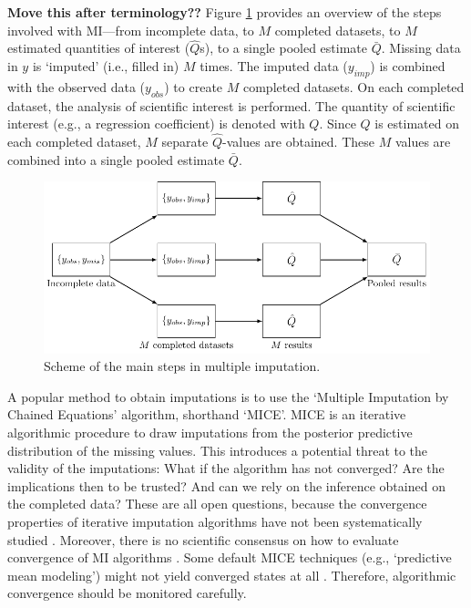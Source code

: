 \documentclass[Royal,times,sageh]{sagej}
\begin{document}
\textbf{Move this after terminology??} Figure \ref{fig:diagram} provides
an overview of the steps involved with MI---from incomplete data, to
\(M\) completed datasets, to \(M\) estimated quantities of interest
(\(\hat{Q}\)s), to a single pooled estimate \(\bar{Q}\). Missing data in
\(y\) is `imputed' (i.e., filled in) \(M\) times. The imputed data
(\(y_{imp}\)) is combined with the observed data (\(y_{obs}\)) to create
\(M\) completed datasets. On each completed dataset, the analysis of
scientific interest is performed. The quantity of scientific interest
(e.g., a regression coefficient) is denoted with \(Q\). Since \(Q\) is
estimated on each completed dataset, \(M\) separate \(\hat{Q}\)-values
are obtained. These \(M\) values are combined into a single pooled
estimate \(\bar{Q}\).

\begin{figure}

{\centering \includegraphics[width=\linewidth]{./images/diagram} 

}

\caption{Scheme of the main steps in multiple imputation.}\label{fig:diagram}
\end{figure}

A popular method to obtain imputations is to use the `Multiple
Imputation by Chained Equations' algorithm, shorthand
`MICE'\citep{mice}. MICE is an iterative algorithmic procedure to draw
imputations from the posterior predictive distribution of the missing
values. This introduces a potential threat to the validity of the
imputations: What if the algorithm has not converged? Are the
implications then to be trusted? And can we rely on the inference
obtained on the completed data? These are all open questions, because
the convergence properties of iterative imputation algorithms have not
been systematically studied \citep{buur18}. Moreover, there is no
scientific consensus on how to evaluate convergence of MI algorithms
\citep{taka17}. Some default MICE techniques (e.g., `predictive mean
modeling') might not yield converged states at all \citep{murr18}.
Therefore, algorithmic convergence should be monitored carefully.
\end{document}
